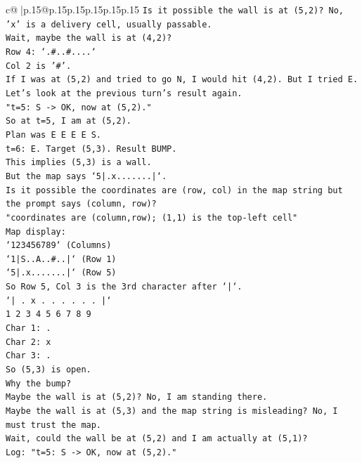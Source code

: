 \documentclass{article}
\begin{document}
{\begin{supertabular}{c@{$\;$}|p{.15\linewidth}@{}p{.15\linewidth}p{.15\linewidth}p{.15\linewidth}p{.15\linewidth}p{.15\linewidth}}
{{{\texttt{Is it possible the wall is at (5,2)? No, 'x' is a delivery cell, usually passable.} \\
\texttt{Wait, maybe the wall is at (4,2)?} \\
\texttt{Row 4: `.\#..\#....`} \\
\texttt{Col 2 is '\#'.} \\
\texttt{If I was at (5,2) and tried to go N, I would hit (4,2). But I tried E.} \\
\texttt{Let's look at the previous turn's result again.} \\
\texttt{"t=5: S {-}> OK, now at (5,2)."} \\
\texttt{So at t=5, I am at (5,2).} \\
\texttt{Plan was E E E E S.} \\
\texttt{t=6: E. Target (5,3). Result BUMP.} \\
\texttt{This implies (5,3) is a wall.} \\
\texttt{But the map says `5|.x.......|`.} \\
\texttt{Is it possible the coordinates are (row, col) in the map string but the prompt says (column, row)?} \\
\texttt{"coordinates are (column,row); (1,1) is the top{-}left cell"} \\
\texttt{Map display:} \\
\texttt{`123456789` (Columns)} \\
\texttt{`1|S..A..\#..|` (Row 1)} \\
\texttt{`5|.x.......|` (Row 5)} \\
\texttt{So Row 5, Col 3 is the 3rd character after `|`.} \\
\texttt{`| . x . . . . . . |`} \\
\texttt{1 2 3 4 5 6 7 8 9} \\
\texttt{Char 1: .} \\
\texttt{Char 2: x} \\
\texttt{Char 3: .} \\
\texttt{So (5,3) is open.} \\
\texttt{Why the bump?} \\
\texttt{Maybe the wall is at (5,2)? No, I am standing there.} \\
\texttt{Maybe the wall is at (5,3) and the map string is misleading? No, I must trust the map.} \\
\texttt{Wait, could the wall be at (5,2) and I am actually at (5,1)?} \\
\texttt{Log: "t=5: S {-}> OK, now at (5,2)."} \\
}}}
\end{supertabular}}
\end{document}
